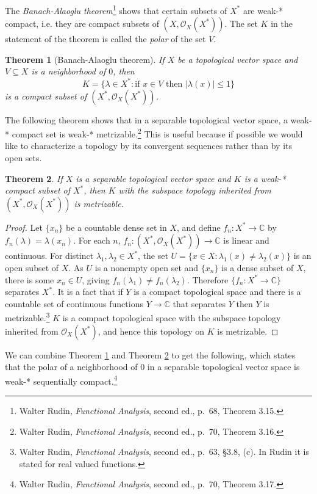 \documentclass{article}
\newtheorem{theorem}{Theorem}
\begin{document}
The {\em Banach-Alaoglu theorem}\footnote{Walter Rudin, {\em Functional Analysis}, second
ed., p.~68, Theorem 3.15.} shows that certain subsets of $X^*$ are weak-* compact, i.e. they are compact subsets of $(X,\mathcal{O}_X(X^*))$. The set $K$ in the statement of the theorem is called
the {\em polar} of the set $V$.

\begin{theorem}[Banach-Alaoglu theorem]
If $X$ be a topological vector space and  $V \subseteq X$ is a neighborhood of $0$, then
\[
K=\{\lambda \in X^*:\textrm{if $x \in V$ then $|\lambda(x)| \leq 1$}\}
\]
 is a compact subset of $(X^*,\mathcal{O}_X(X^*))$.
\label{alaoglu}
\end{theorem}

The following theorem shows that
in a separable topological vector space, a weak-* compact set is weak-* metrizable.\footnote{Walter Rudin, {\em Functional Analysis}, second ed., p.~70, Theorem 3.16.}
This is useful because if possible we would like to characterize a topology
by its convergent sequences rather than by its open sets.

\begin{theorem}
If $X$ is a separable topological vector space and $K$ is a weak-* compact subset of $X^*$, then
$K$ with the subspace topology inherited from  $(X^*,\mathcal{O}_X(X^*))$ is metrizable.
\label{metrizable}
\end{theorem}
\begin{proof}
Let $\{x_n\}$ be a countable dense set in $X$, and define $f_n:X^* \to \mathbb{C}$ by
$f_n(\lambda)=\lambda (x_n)$. For each $n$,   $f_n:(X^*,\mathcal{O}_X(X^*)) \to \mathbb{C}$ is linear and continuous.
For distinct $\lambda_1,\lambda_2 \in X^*$, the set $U=\{x \in X: \lambda_1(x) \neq \lambda_2(x)\}$ is an open subset
of $X$.  As $U$ is a nonempty open set and $\{x_n\}$ is a dense subset of $X$, there is some $x_n \in U$, giving $f_n(\lambda_1) \neq f_n(\lambda_2)$. Therefore
$\{f_n:X^* \to \mathbb{C}\}$ separates $X^*$. It is a fact that if $Y$ is a compact topological space and there is a countable set of
continuous functions $Y \to \mathbb{C}$ that separates $Y$ then $Y$ is metrizable.\footnote{Walter Rudin, {\em Functional Analysis}, second ed.,
p.~63, \S 3.8, (c). In Rudin it is stated for real valued functions.}
 $K$ is a compact topological space with the subspace topology inherited from $\mathcal{O}_X(X^*)$, and hence this topology on
$K$ is metrizable.
\end{proof}

We can combine Theorem \ref{alaoglu} and Theorem \ref{metrizable} to get the following, which  states that the
polar of a neighborhood of $0$ in a separable topological vector space is weak-* sequentially compact.\footnote{Walter Rudin, {\em Functional Analysis}, second ed.,
p.~70, Theorem 3.17.}
\end{document}
